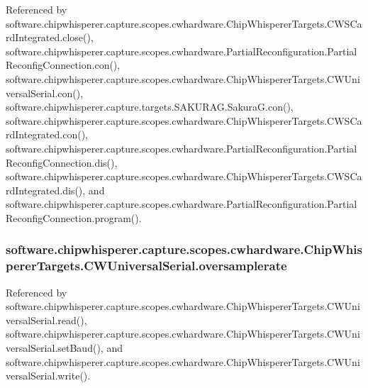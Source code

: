 Referenced by software.\+chipwhisperer.\+capture.\+scopes.\+cwhardware.\+Chip\+Whisperer\+Targets.\+C\+W\+S\+Card\+Integrated.\+close(), software.\+chipwhisperer.\+capture.\+scopes.\+cwhardware.\+Partial\+Reconfiguration.\+Partial\+Reconfig\+Connection.\+con(), software.\+chipwhisperer.\+capture.\+scopes.\+cwhardware.\+Chip\+Whisperer\+Targets.\+C\+W\+Universal\+Serial.\+con(), software.\+chipwhisperer.\+capture.\+targets.\+S\+A\+K\+U\+R\+A\+G.\+Sakura\+G.\+con(), software.\+chipwhisperer.\+capture.\+scopes.\+cwhardware.\+Chip\+Whisperer\+Targets.\+C\+W\+S\+Card\+Integrated.\+con(), software.\+chipwhisperer.\+capture.\+scopes.\+cwhardware.\+Partial\+Reconfiguration.\+Partial\+Reconfig\+Connection.\+dis(), software.\+chipwhisperer.\+capture.\+scopes.\+cwhardware.\+Chip\+Whisperer\+Targets.\+C\+W\+S\+Card\+Integrated.\+dis(), and software.\+chipwhisperer.\+capture.\+scopes.\+cwhardware.\+Partial\+Reconfiguration.\+Partial\+Reconfig\+Connection.\+program().

\hypertarget{classsoftware_1_1chipwhisperer_1_1capture_1_1scopes_1_1cwhardware_1_1ChipWhispererTargets_1_1CWUniversalSerial_aeead313791f2e3fb8b173596ad8953c1}{}
\subsubsection[{oversamplerate}]{\setlength{\rightskip}{0pt plus 5cm}software.\+chipwhisperer.\+capture.\+scopes.\+cwhardware.\+Chip\+Whisperer\+Targets.\+C\+W\+Universal\+Serial.\+oversamplerate}\label{classsoftware_1_1chipwhisperer_1_1capture_1_1scopes_1_1cwhardware_1_1ChipWhispererTargets_1_1CWUniversalSerial_aeead313791f2e3fb8b173596ad8953c1}


Referenced by software.\+chipwhisperer.\+capture.\+scopes.\+cwhardware.\+Chip\+Whisperer\+Targets.\+C\+W\+Universal\+Serial.\+read(), software.\+chipwhisperer.\+capture.\+scopes.\+cwhardware.\+Chip\+Whisperer\+Targets.\+C\+W\+Universal\+Serial.\+set\+Baud(), and software.\+chipwhisperer.\+capture.\+scopes.\+cwhardware.\+Chip\+Whisperer\+Targets.\+C\+W\+Universal\+Serial.\+write().

